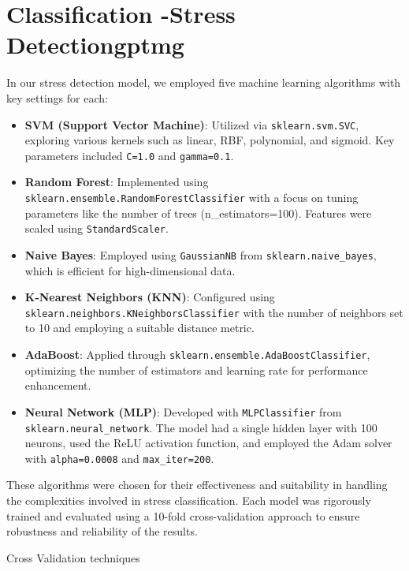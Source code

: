 \section{Classification -Stress Detection\gls{gptmg}}

In our stress detection model, we employed five machine learning algorithms with key settings for each:
\begin{itemize}
  \item \textbf{SVM (Support Vector Machine)}: Utilized via \texttt{sklearn.svm.SVC}, exploring various kernels such as linear, RBF, polynomial, and sigmoid. Key parameters included \texttt{C=1.0} and \texttt{gamma=0.1}.
  
  \item \textbf{Random Forest}: Implemented using \texttt{sklearn.ensemble.RandomForestClassifier} with a focus on tuning parameters like the number of trees (n\_estimators=100). Features were scaled using \texttt{StandardScaler}.

  \item \textbf{Naive Bayes}: Employed using \texttt{GaussianNB} from \texttt{sklearn.naive\_bayes}, which is efficient for high-dimensional data.

  \item \textbf{K-Nearest Neighbors (KNN)}: Configured using \texttt{sklearn.neighbors.KNeighborsClassifier} with the number of neighbors set to 10 and employing a suitable distance metric.

  \item \textbf{AdaBoost}: Applied through \texttt{sklearn.ensemble.AdaBoostClassifier}, optimizing the number of estimators and learning rate for performance enhancement.

  \item \textbf{Neural Network (MLP)}: Developed with \texttt{MLPClassifier} from \texttt{sklearn.neural\_network}. The model had a single hidden layer with 100 neurons, used the ReLU activation function, and employed the Adam solver with \texttt{alpha=0.0008} and \texttt{max\_iter=200}.
\end{itemize}

These algorithms were chosen for their effectiveness and suitability in handling the complexities involved in stress classification. Each model was rigorously trained and evaluated using a 10-fold cross-validation approach to ensure robustness and reliability of the results.



Cross Validation techniques

